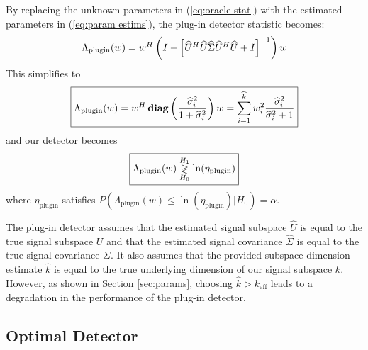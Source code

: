 By replacing the unknown parameters in (\ref{eq:oracle stat}) with the estimated parameters in (\ref{eq:param estims}), the plug-in detector statistic becomes:
\begin{equation*}
\Lambda_{\text{plugin}}(w)= w^H\left(I-\left[\widehat{U}^H\widehat{U}\widehat{\Sigma}\widehat{U}^H\widehat{U} + I\right]^{-1}\right)w\\
\end{equation*}
This simplifies to
\begin{equation}\label{eq:plugin stat}
\boxed{\Lambda_{\text{plugin}}(w) = w^H\diag\left(\frac{\widehat{\sigma}^2_i}{1+\widehat{\sigma}^2_i}\right)w=\sum_{i=1}^{\widehat{k}}w_i^2\frac{\widehat{\sigma}_i^2}{\widehat{\sigma}_i^2+1}}
\end{equation}
and our detector becomes
\begin{equation}\label{eq:plugin classifier}
\boxed{\Lambda_{\text{plugin}}(w) \detgtrless \ln(\eta_{\text{plugin}})}
\end{equation}
where $\eta_{\text{plugin}}$ satisfies $P(\Lambda_{\text{plugin}}(w)\leq\ln\left(\eta_{\text{plugin}}\right)|H_0)=\alpha$.

The plug-in detector assumes that the estimated signal subspace $\widehat{U}$ is equal to the true signal subspace $U$ and that the estimated signal covariance $\widehat{\Sigma}$ is equal to the true signal covariance $\Sigma$. It also assumes that the provided subspace dimension estimate $\widehat{k}$ is equal to the true underlying dimension of our signal subspace $k$. However, as shown in Section \ref{sec:params}, choosing $\widehat{k} > k_\text{eff}$ leads to a degradation in the performance of the plug-in detector.

\subsection{Optimal Detector}\label{sec:optimal}

